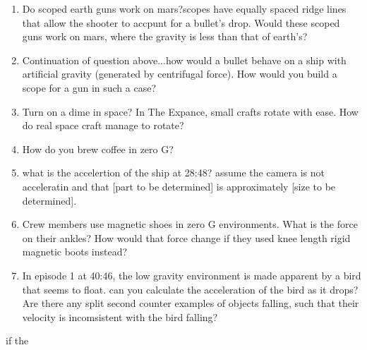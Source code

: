 \documentclass{amsart}
\theoremstyle{definition}
\begin{document}
\begin{enumerate}
    \item Do scoped earth guns work on mars?scopes have equally spaced ridge lines that allow the shooter to accpunt for a bullet's drop. Would these scoped guns work on mars, where the gravity is less than that of earth's?
    \item Continuation of question above...how would a bullet behave on a ship with artificial gravity (generated by centrifugal force). How would you build a scope for a gun in such a case?
    \item Turn on a dime in space? In The Expance, small crafts rotate with ease. How do real space craft manage to rotate?
    \item How do you brew coffee in zero G?
    \item what is the accelertion of the ship at 28:48? assume the camera is not acceleratin and that [part to be determined] is approximately [size to be determined].
    \item Crew members use magnetic shoes in zero G environments. What is the force on their ankles? How would that force change if they used knee length rigid magnetic boots instead?
    \item In episode 1 at 40:46, the low gravity environment is made apparent by a bird that seems to float. can you calculate the acceleration of the bird as it drops? Are there any split second counter examples of objects falling, such that their velocity is incomsistent with the bird falling?
    
\end{enumerate}
if the
\end{document}
